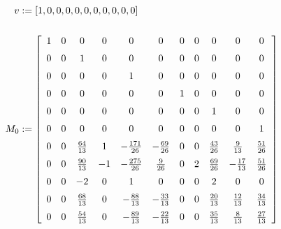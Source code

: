 \documentclass[11pt,reqno]{amsart}
\numberwithin{equation}{section}
\theoremstyle{plain}
\theoremstyle{definition}
\theoremstyle{remark}
\begin{document}
\begin{align*}
v & := [1, 0, 0, 0, 0, 0, 0, 0, 0, 0, 0] \\
\ \\
M_0 &:= \left[ \begin {array}{ccccccccccc} 1&0&0&0&0&0&0&0&0&0&0\\ \noalign{\medskip}0&0&1&0
&0&0&0&0&0&0&0\\ \noalign{\medskip}0&0&0&0&1&0&0&0&0&0&0\\ \noalign{\medskip}0&0&0&0
&0&0&1&0&0&0&0\\ \noalign{\medskip}0&0&0&0&0&0&0&0&1&0&0\\ \noalign{\medskip}0&0&0&0
&0&0&0&0&0&0&1\\ \noalign{\medskip}0&0&{\frac {64}{13}}&1&-{\frac {171}{26}}&-{
\frac {69}{26}}&0&0&{\frac {43}{26}}&{\frac {9}{13}}&{\frac {51}{26}}
\\ \noalign{\medskip}0&0&{\frac {90}{13}}&-1&-{\frac {275}{26}}&{\frac {9}{26}}&0&2&
{\frac {69}{26}}&-{\frac {17}{13}}&{\frac {51}{26}}\\ \noalign{\medskip}0&0&-2&0&1&0
&0&0&2&0&0\\ \noalign{\medskip}0&0&{\frac {68}{13}}&0&-{\frac {88}{13}}&-{\frac {33}
{13}}&0&0&{\frac {20}{13}}&{\frac {12}{13}}&{\frac {34}{13}}\\ \noalign{\medskip}0&0
&{\frac {54}{13}}&0&-{\frac {89}{13}}&-{\frac {22}{13}}&0&0&{\frac {35}{13}}&{\frac 
{8}{13}}&{\frac {27}{13}}\end {array} \right] 
\end{align*}
\end{document}
